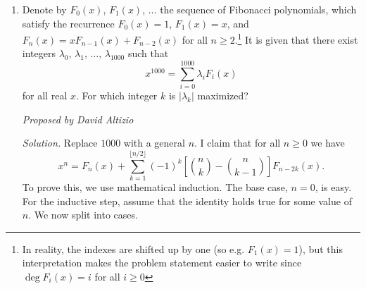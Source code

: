 \documentclass[10pt]{article}
\newcommand{\proposed}[1]
{
\vspace{5pt}
\noindent\textit{Proposed by #1}
}
\newcommand{\solution}
{
\vspace{5pt}
\noindent\textit{Solution.}\qquad
}
\begin{document}
\begin{enumerate}
\solution By Cauchy-Schwarz, \[\sqrt{\lfloor x\rfloor\lfloor x^3\rfloor}+\sqrt{\{x\}\{x^3\}}\le\sqrt{(\lfloor x\rfloor+\{x\})(\lfloor x^3\rfloor+\{x^3\})}=x^2.\] This in turn means that we actually have equality.  Recall that in the two variable case of Cauchy-Schwarz, \[(a^2+b^2)(c^2+d^2)\geq(ac+bd)^2,\] the equality case holds when $\tfrac ac=\tfrac bd$, or $ad=bc$.  Applying this here yields  \begin{align*}&\qquad\quad\lfloor x\rfloor\{x^3\}=\lfloor x^3\rfloor\{x\}\\&\iff\lfloor x\rfloor x^2=\lfloor x^3\rfloor\\&\iff2\lfloor x\rfloor^2\{x\}+\lfloor x\rfloor\{x\}^2=\left\lfloor3\lfloor x\rfloor^2\{x\}+3\lfloor x\rfloor\{x\}^2+\{x\}^3\right\rfloor.\end{align*} We also have $\lfloor x\rfloor x^2=\lfloor x^3\rfloor>x^3-1$, so $\lfloor x\rfloor>x-\frac1{x^2}$, i.e. $\{x\}<\frac1{x^2}$. This allows us to easily bound \[\lfloor3\lfloor x\rfloor^2\{x\}+3\lfloor x\rfloor\{x\}^2+\{x\}^3\rfloor\in\{0,1,2,3\},\] which means $\lfloor x\rfloor\{x\}(2\lfloor x\rfloor+\{x\})\in\{0,1,2,3\}$. Let this expression equal $r$.  Writing this as a quadratic in $\{x\}$ and using the Quadratic Formula yields \[\{x\}=-\lfloor x\rfloor+\frac{\sqrt{\lfloor x\rfloor^4+r\lfloor x\rfloor}}{\lfloor x\rfloor},\] where $r\in\{0,1,2,3\}$. Since we need this to be in the interval $[0,\frac1{x^2})$, we can further bound to get that these values work precisely when $r\in\{0,1\}$. Thus, the solution set is $x_{2n-1}=n$, $x_{2n}=\sqrt{n^2+\frac1n}$ for $n=1,2,\dots,50$. Finally, we compute \[\sum_{n=1}^{50}\frac1{(\sqrt{n^2+1/n})^2-n^2}=\sum_{n=1}^{50}n=\frac{50(51)}2=\boxed{1275}.\]

\item Denote by $F_0(x)$, $F_1(x)$, $\ldots$ the sequence of Fibonacci polynomials, which satisfy the recurrence $F_0(x)=1$, $F_1(x)=x$, and $F_n(x)=xF_{n-1}(x)+F_{n-2}(x)$ for all $n\geq 2$.\footnote{In reality, the indexes are shifted up by one (so e.g. $F_1(x)=1$), but this interpretation makes the problem statement easier to write since $\deg F_i(x) = i$ for all $i\geq 0$}  It is given that there exist integers $\lambda_0$, $\lambda_1$, $\ldots$, $\lambda_{1000}$ such that \[x^{1000}=\sum_{i=0}^{1000}\lambda_iF_i(x)\] for all real $x$.  For which integer $k$ is $|\lambda_k|$ maximized?

\proposed{David Altizio}

\solution Replace $1000$ with a general $n$.  I claim that for all $n\geq 0$ we have \[x^n=F_n(x)+\sum_{k=1}^{\lfloor n/2\rfloor}(-1)^k\left[\binom nk-\binom n{k-1}\right]F_{n-2k}(x).\] To prove this, we use mathematical induction.  The base case, $n=0$, is easy.  For the inductive step, assume that the identity holds true for some value of $n$.  We now split into cases.


\end{enumerate}
\end{document}
